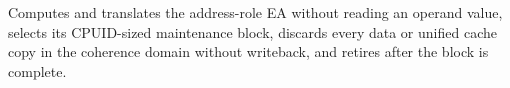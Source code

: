 Computes and translates the address-role EA without reading an operand value, selects its CPUID-sized maintenance block, discards every data or unified cache copy in the coherence domain without writeback, and retires after the block is complete.
